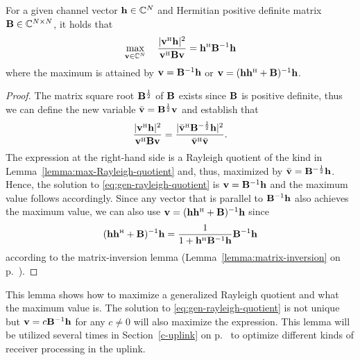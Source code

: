 \begin{lemma} \label{lemma:gen-rayleigh-quotient}
For a given channel vector $\mathbf{h} \in \mathbb{C}^{N}$ and Hermitian positive definite matrix $\mathbf{B} \in \mathbb{C}^{N \times N}$, it holds that
\begin{equation} \label{eq:gen-rayleigh-quotient}
\max_{\vect{v} \in \mathbb{C}^N} \quad \frac{  |  \vect{v}^{\Htran} \vect{h} |^2  }{ \vect{v}^{\Htran} \vect{B} \vect{v}} = \vect{h}^{\Htran} \vect{B}^{-1} \vect{h}
\end{equation}
where the maximum is attained by $\mathbf{v} = \mathbf{B}^{-1} \mathbf{h}$ or $\vect{v} = (\vect{h} \vect{h}^{\Htran}+\vect{B})^{-1} \vect{h}$.
\end{lemma}
\begin{proof}
The matrix square root $\mathbf{B}^{\frac12}$ of $\mathbf{B}$ exists since $\mathbf{B}$ is positive definite, thus we can define the new variable $\bar{\mathbf{v} } = \mathbf{B}^{\frac12} \mathbf{v}$ and establish that
\begin{equation}
\frac{  |  \vect{v}^{\Htran} \vect{h} |^2  }{ \vect{v}^{\Htran} \vect{B} \vect{v}}  = \frac{  |  \bar{\vect{v}}^{\Htran} \vect{B}^{-\frac12} \vect{h} |^2  }{  \bar{\vect{v}}^{\Htran} \bar{\vect{v}}  }.
\end{equation}
The expression at the right-hand side is a Rayleigh quotient of the kind in Lemma~\ref{lemma:max-Rayleigh-quotient} and, thus, maximized by $\bar{\mathbf{v} } = \mathbf{B}^{-\frac12} \mathbf{h}$. Hence, the solution to \eqref{eq:gen-rayleigh-quotient} is $\mathbf{v} = \mathbf{B}^{-1} \mathbf{h}$ and the maximum value follows accordingly.
Since any vector that is parallel to $ \mathbf{B}^{-1} \mathbf{h}$ also achieves the maximum value, we can also use
$\vect{v} = (\vect{h} \vect{h}^{\Htran}+\vect{B})^{-1} \vect{h}$ since
\begin{equation}
(\vect{h} \vect{h}^{\Htran}+\vect{B})^{-1} \vect{h} = \frac{1}{1+\vect{h}^{\Htran} \vect{B}^{-1} \vect{h}} \vect{B}^{-1} \vect{h}
\end{equation}
according to the matrix-inversion lemma (Lemma~\ref{lemma:matrix-inversion} on p.~\pageref{lemma:matrix-inversion}).
\end{proof}

This lemma shows how to maximize a generalized Rayleigh quotient and what the maximum value is. The solution to \eqref{eq:gen-rayleigh-quotient} is not unique but  $\mathbf{v} = c \mathbf{B}^{-1} \mathbf{h}$ for any $c \neq 0$ will also maximize the expression.
This lemma will be utilized several times in Section~\ref{c-uplink} on p.~\pageref{c-uplink} to optimize different kinds of receiver processing in the uplink.





